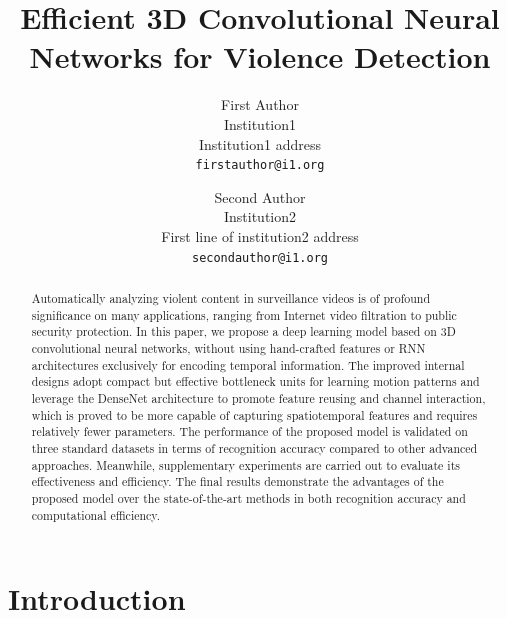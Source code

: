 \documentclass[10pt,twocolumn,letterpaper]{article}
\begin{document}
\title{Efficient 3D Convolutional Neural Networks for Violence Detection}

\author{First Author\\
Institution1\\
Institution1 address\\
{\tt\small firstauthor@i1.org}
\and
Second Author\\
Institution2\\
First line of institution2 address\\
{\tt\small secondauthor@i1.org}
}

\maketitle

\begin{abstract}
Automatically analyzing violent content in surveillance videos is of profound significance on many applications, ranging from Internet video filtration to public security protection. In this paper, we propose a deep learning model based on 3D convolutional neural networks, without using hand-crafted features or RNN architectures exclusively for encoding temporal information. The improved internal designs adopt compact but effective bottleneck units for learning motion patterns and leverage the DenseNet architecture to promote feature reusing and channel interaction, which is proved to be more capable of capturing spatiotemporal features and requires relatively fewer parameters. The performance of the proposed model is validated on three standard datasets in terms of recognition accuracy compared to other advanced approaches. Meanwhile, supplementary experiments are carried out to evaluate its effectiveness and efficiency. The final results demonstrate the advantages of the proposed model over the state-of-the-art methods in both recognition accuracy and computational efficiency.
\end{abstract}

\section{Introduction}
\label{sec:1}
\end{document}
